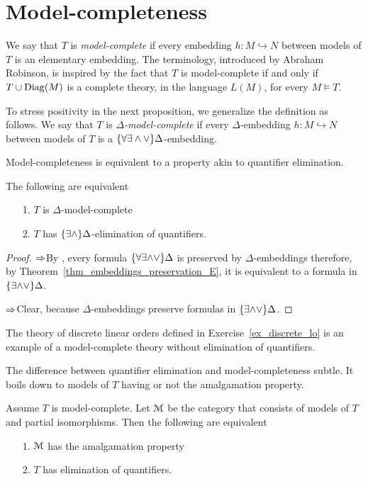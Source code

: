 \section{Model-completeness}

We say that $T$ is \emph{model-complete\/} if every embedding $h:M\hookrightarrow N$ between models of $T$ is an elementary embedding. The terminology, introduced by Abraham Robinson, is inspired by the fact that $T$ is model-complete if and only if $T\cup{\rm Diag}(M)$ is a complete theory, in the language $L(M)$, for every $M\models T$. 

To stress positivity in the next proposition, we generalize the definition as follows. We say that $T$ is \emph{$\Delta$-model-complete\/} if every $\Delta$-embedding $h:M\hookrightarrow N$ between models of $T$ is a $\{\forall\exists\wedge\vee\}\Delta$-embedding. 

Model-completeness is equivalent to a property akin to quantifier elimination.

\begin{proposition}
The following are equivalent
\begin{itemize}
\item[1.] $T$ is $\Delta$-model-complete
\item[2.] $T$ has $\{\exists\wedge\}\Delta$-elimination of quantifiers.
\end{itemize}
\end{proposition}

\begin{proof}
$\Rightarrow$\quad By , every formula $\{\forall\exists\mathord\wedge\mathord\vee\}\Delta$ is preserved by $\Delta$-embeddings therefore, by Theorem~\ref{thm_embeddings_preservation_E}, it is equivalent to a formula in $\{\exists\mathord\wedge\mathord\vee\}\Delta$.

$\Rightarrow$\quad Clear, because $\Delta$-embeddings preserve formulas in $\{\exists\mathord\wedge\mathord\vee\}\Delta$.
\end{proof}

The theory of discrete linear orders defined in Exercise~\ref{ex_discrete_lo} is an example of a model-complete theory without elimination of quantifiers.


The difference between quantifier elimination and model-completeness subtle. It boils down to models of $T$ having or not the amalgamation property.

\begin{proposition}
Assume $T$ is model-complete. Let $\EuScript M$ be the category that consists of models of $T$ and partial isomorphisms. Then the following are equivalent
\begin{itemize}
\item[1.] $\EuScript M$ has the amalgamation property
\item[2.] $T$ has elimination of quantifiers.
\end{itemize}
\end{proposition}

